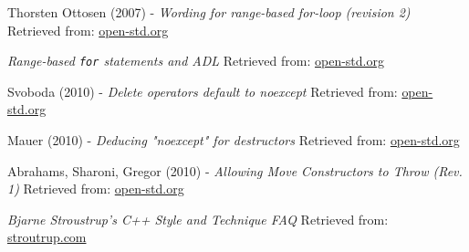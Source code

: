     Thorsten Ottosen (2007) - \emph{Wording for range-based for-loop (revision 2)}
    \newline
    Retrieved from: \href{https://www.open-std.org/jtc1/sc22/wg21/docs/papers/2007/n2243.html}{open-std.org}    
    
    \emph{Range-based \texttt{for} statements and ADL}
    \newline
    Retrieved from: \href{https://www.open-std.org/jtc1/sc22/wg21/docs/papers/2011/n3257.pdf}{open-std.org}    
    
    Svoboda (2010) - \emph{Delete operators default to noexcept}
    \newline
    Retrieved from: \href{https://www.open-std.org/jtc1/sc22/wg21/docs/papers/2010/n3205.htm}{open-std.org}
    
    Mauer (2010) - \emph{Deducing "noexcept" for destructors}
    \newline
    Retrieved from: \href{https://www.open-std.org/jtc1/sc22/wg21/docs/papers/2010/n3204.htm}{open-std.org}
    
    Abrahams, Sharoni, Gregor (2010) - \emph{Allowing Move Constructors to Throw (Rev. 1)}
    \newline
    Retrieved from: \href{https://www.open-std.org/jtc1/sc22/wg21/docs/papers/2010/n3050.html}{open-std.org}
    
    \emph{Bjarne Stroustrup's C++ Style and Technique FAQ}
    \newline
    Retrieved from: \href{https://www.stroustrup.com/bs_faq2.html}{stroutrup.com}    
    
